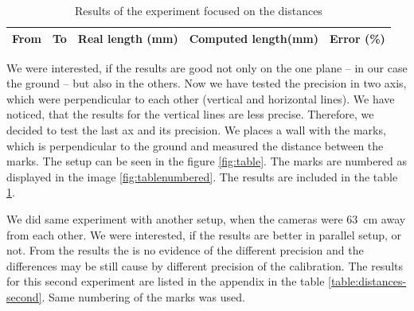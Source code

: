\begin{table}
\centering
\begin{tabular}{|r|r|r|r|r|}
\hline
From	& To	& Real length (mm) & Computed length(mm) & Error (\%) \\
\hline
\hline

\hline
\end{tabular}
\label{table:distances}
\caption{Results of the experiment focused on the distances}
\end{table}

We were interested, if the results are good not only on the one plane -- in our
case the ground -- but also in the others. Now we have tested the precision in
two axis, which were perpendicular to each other (vertical and horizontal
lines). We have noticed, that the results for the vertical lines are less
precise. Therefore, we decided to test the last ax and its precision. We places
a wall with the marks, which is perpendicular to the ground and measured the
distance between the marks. The setup can be seen in the figure
\ref{fig:table}. The marks are numbered as displayed in the image
\ref{fig:tablenumbered}. The results are included in the table
\ref{table:distances}. 

We did same experiment with another setup, when the cameras were 63~cm away
from each other. We were interested, if the results are better in parallel
setup, or not. From the results the is no evidence of the different precision
and the differences may be still cause by different precision of the
calibration. The results for this second experiment are listed in the appendix
in the table \ref{table:distances-second}. Same numbering of the marks was used.

